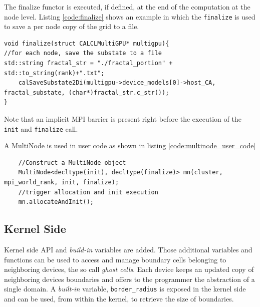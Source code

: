 The finalize functor is executed, if defined, at the end of the computation at the node level. Listing \ref{code:finalize} shows an example in which the \texttt{finalize} is used to save a per node copy of the grid to a file.
\begin{lstlisting}
void finalize(struct CALCLMultiGPU* multigpu){
//for each node, save the substate to a file
std::string fractal_str = "./fractal_portion" + std::to_string(rank)+".txt";
    calSaveSubstate2Di(multigpu->device_models[0]->host_CA, fractal_substate, (char*)fractal_str.c_str());
}
\end{lstlisting}
Note that an implicit MPI barrier is present right before the execution of the \texttt{init} and \texttt{finalize} call.

A MultiNode is used in user code as shown in listing \ref{code:multinode_user_code}

\begin{lstlisting}
    //Construct a MultiNode object
    MultiNode<decltype(init), decltype(finalize)> mn(cluster, mpi_world_rank, init, finalize);
    //trigger allocation and init execution
    mn.allocateAndInit();
\end{lstlisting}

\subsection{Kernel Side }
Kernel side  API  and \textit{build-in} variables are added. Those additional variables and functions can be used to access and manage boundary cells belonging to neighboring devices, the so call \textit{ghost cells}. Each device keeps an updated copy of neighboring devices boundaries and offers to the programmer the abstraction of a single domain. A \textit{built-in} variable, \texttt{border\_radius} is exposed in the kernel side and can be used, from within the kernel, to retrieve the size of boundaries.


